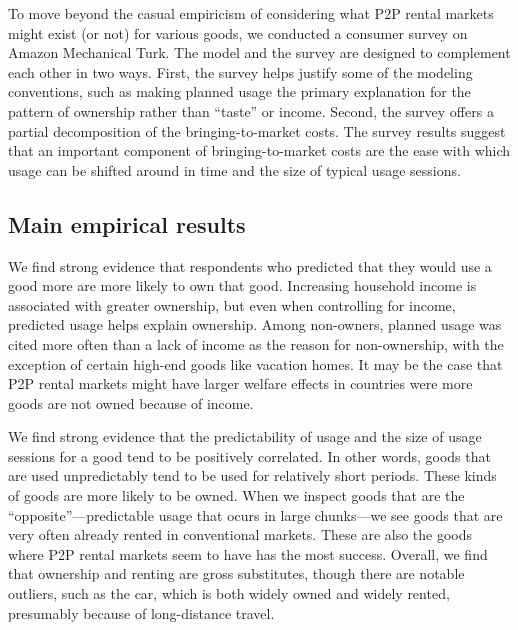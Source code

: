 \documentclass[11pt]{article}
\begin{document}
To move beyond the casual empiricism of considering what P2P rental markets might exist (or not) for various goods, we conducted a consumer survey on Amazon Mechanical Turk. 
The model and the survey are designed to complement each other in two ways. 
First, the survey helps justify some of the modeling conventions, such as making planned usage the primary explanation for the pattern of ownership rather than ``taste'' or income. 
Second, the survey offers a partial decomposition of the bringing-to-market costs. 
The survey results suggest that an important component of bringing-to-market costs are the ease with which usage can be shifted around in time and the size of typical usage sessions. 

\subsection{Main empirical results}
We find strong evidence that respondents who predicted that they would use a good more are more likely to own that good.
Increasing household income is associated with greater ownership, but even when controlling for income, predicted usage helps explain ownership. 
Among non-owners, planned usage was cited more often than a lack of income as the reason for non-ownership, with the exception of certain high-end goods like vacation homes.
It may be the case that P2P rental markets might have larger welfare effects in countries were more goods are not owned because of income.

We find strong evidence that the predictability of usage and the size of usage sessions for a good tend to be positively correlated.
In other words, goods that are used unpredictably tend to be used for relatively short periods.
These kinds of goods are more likely to be owned. 
When we inspect goods that are the ``opposite''---predictable usage that ocurs in large chunks---we see goods that are very often already rented in conventional markets.
These are also the goods where P2P rental markets seem to have has the most success.
Overall, we find that ownership and renting are gross substitutes, though there are notable outliers, such as the car, which is both widely owned and widely rented, presumably because of long-distance travel. 
\end{document}

